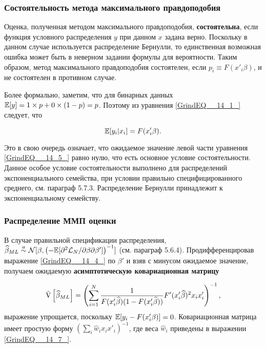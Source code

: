 \subsubsection*{Состоятельность метода максимального правдоподобия}

Оценка, полученная методом максимального правдоподобия, \textbf{состоятельна},  если функция условного распределения $y$ при данном $x$ задана верно. Поскольку в данном случае используется распределение Бернулли,  то единственная возможная ошибка может быть в неверном задании формулы для вероятности. Таким образом,  метод максимального правдоподобия состоятелен,  если $p_i \equiv F(x'_i\beta)$,  и не состоятелен в противном случае.

Более формально,  заметим,  что для бинарных данных $\mathbb{E}[y]=1\times p+0\times (1-p)=p$. Поэтому из уравнения \eqref{GrindEQ__14_1_} следует,  что 

\begin{equation} 
\label{GrindEQ__14_6_} 
\mathbb{E}[y_i|x_i]=F(x'_i\beta). 
\end{equation} 

Это в свою очередь означает,  что ожидаемое значение левой части уравнения \eqref{GrindEQ__14_5_}  равно нулю, что есть основное  условие состоятельности. Данное особое условие состоятельности выполнено для распределений экспоненциального семейства, при условии правильно специфицированного среднего, см. параграф 5.7.3.  Распределение Бернулли принадлежит к экспоненциальному семейству.

\subsubsection*{Распределение ММП оценки}

В случае правильной спецификации  распределения,  $\widehat\beta_{ML} \overset{a}{\sim} \mathcal{N}[\beta,  \left(-\mathbb{E}[\partial^2 \mathcal{L}_N /\partial \beta \partial \beta' ]\right)^{-1}]$ (см. параграф 5.6.4). Продифференцировав выражение \eqref{GrindEQ__14_4_} по $\beta'$ и взяв с минусом ожидаемое значение,  получаем ожидаемую \textbf{асимптотическую ковариационная матрицу}

\begin{equation} 
\label{GrindEQ__14_7_} 
\hat{\mathrm{V}} \left[ \widehat\beta_{ML} \right] = \left( \sum^N_{i=1} \frac{1}{F(x'_i \widehat\beta) (1-F(x'_i \widehat\beta))} F'(x'_i\widehat\beta)^2 x_i x'_i\right)^{-1},  
\end{equation} 
выражение упрощается, поскольку $\mathbb{E}[y_i-F(x'_i\beta)]=0$. Ковариационная матрица имеет простую форму $(\sum_i \hat{w}_i x_i x'_i)^{-1}$,  где веса $\hat{w}_i$ приведены в выражении \eqref{GrindEQ__14_7_}.


